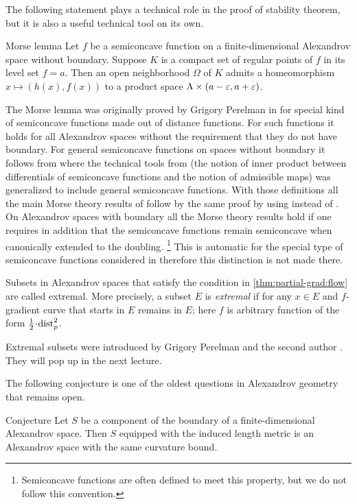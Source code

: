 The following statement plays a technical role in the proof of stability theorem,
but it is also a useful technical tool on its own.

\begin{thm}{Morse lemma}
Let $f$ be a semiconcave function on a finite-dimensional Alexandrov space without boundary.
Suppose $K$ is a compact set of regular points of $f$ in its level set $f=a$.
Then an open neighborhood $\Omega$ of $K$ admits a homeomorphism $x\mapsto (h(x),f(x))$ to a product space $\Lambda\times (a-\varepsilon,a+\varepsilon)$.
\end{thm}

The Morse lemma was originally proved by Grigory Perelman in \cite{perelman1993} for special kind of semiconcave functions made out of distance functions.
For such functions it holds for all Alexandrov spaces without the requirement that they do not have boundary.
For general semiconcave functions on spaces without boundary it follows from \cite{perelman1994} where the technical tools from \cite{perelman1993} (the notion of inner product between differentials of semiconcave functions and the notion of admissible maps) was generalized to include general semiconcave functions. With those definitions all the main Morse theory results of \cite{perelman1993} follow by the same proof by using  \cite[2.2]{perelman1994} instead of \cite[Lemma 1]{perelman1993}.
On Alexandrov spaces with boundary all the Morse theory results hold if one requires in addition that the semiconcave functions remain semiconcave when canonically extended to the doubling.%
\footnote{Semiconcave functions are often defined to meet this property, but we do not follow this convention.}
This is automatic for the special type of semiconcave functions considered in \cite{perelman1993} therefore this distinction is not made there.

Subsets in Alexandrov spaces that satisfy the condition in \ref{thm:partial-grad:flow} are called extremal.
More precisely, a subset $E$ is \emph{extremal} if for any $x\in E$
and $f$-gradient curve that starts in $E$ remains in $E$;
here $f$ is arbitrary function of the form $\tfrac12\cdot \distfun_p^2$. %

Extremal subsets were introduced by Grigory Perelman and the second author \cite{perelman-petrunin}.
They will pop up in the next lecture.

The following conjecture is one of the oldest questions in Alexandrov geometry that remains open.

\begin{thm}{Conjecture}\label{conj:bry}
Let $S$ be a component of the boundary of a finite-dimensional Alexandrov space.
Then $S$ equipped with the induced length metric is an Alexandrov space with the same curvature bound.
\end{thm}
